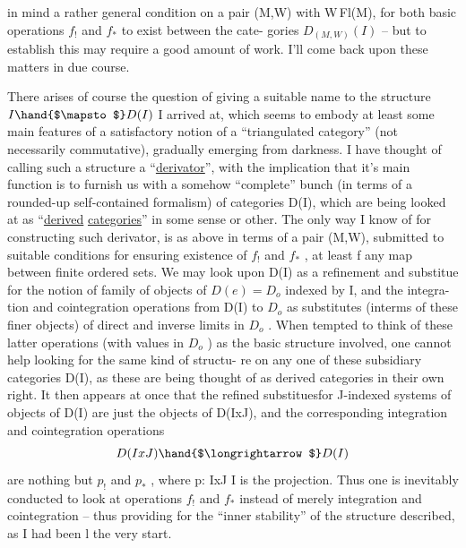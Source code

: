  in
 mind a rather general condition on a pair (M,W) with W\hand{$\subset$}\,Fl(M), for
both basic operations $f_!$ and $f_*$ to exist between the  cate-%
gories $D_{(M,W)}(I)$ -- but to establish this   may require a good amount
of work. I'll come back upon these matters in due course.

There arises of course the question of giving a suitable name to the
structure $I \hand{$\mapsto$} D(I)$ I arrived at, which seems to embody at least some
main features of a satisfactory notion of a ``triangulated category'' (not
necessarily commutative), gradually emerging from darkness. I have
thought of calling such a structure a ``\uline{derivator}'', with the implication
that it's main function is to furnish us with a somehow\hand{\unsure{,}} ``complete'' bunch
(in terms of a rounded-up self-contained formalism) of categories D(I),
which are being looked at as ``\uline{derived} \uline{categories}'' in some sense or other.
The only way I know of for constructing such derivator, is as above in
terms of a pair (M,W), submitted to suitable conditions for ensuring
existence of $f_!$ and $f_*$ , at least  f  any map between finite ordered
sets. We may look upon D(I) as a  refinement and substitue for the
notion of family of objects of $D(e) = D_o$ indexed by I, and the integra-%
tion and cointegration operations from D(I) to $D_o$ as substitutes (interms
of these finer objects) of direct and inverse limits in $D_o$ . When tempted
to think of these latter operations (with values in $D_o$ ) as the basic
structure involved, one cannot help  looking for the same kind of structu-%
re on any one of these subsidiary categories D(I), as these are being
thought of as derived categories in their own right. It then appears at
once that the  refined substitues\hand{/}for J-indexed systems of objects of D(I)
are just the objects of D(IxJ), and the corresponding integration and
cointegration operations
\[ D(IxJ) \hand{$\longrightarrow$} D(I) \]
are nothing but $p_!$ and $p_*$ , where p: IxJ \hand{$\longrightarrow$} I is the projection. Thus
one is inevitably conducted to look at operations $f_!$ and $f_*$ instead of
merely integration and cointegration -- thus providing for the ``inner
stability'' of the structure described, as I had been l
the very start.

